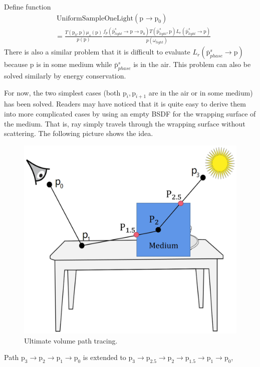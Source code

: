 \documentclass[acmtog]{acmart}
\def\w{\omega}
\def\p{\mathrm{p}}
\def\pp#1#2{\p_{#1}\rightarrow\p_{#2}}
\begin{document}
    Define function
\begin{equation} \label{eq16}
\begin{split}
    &\ \mathrm{UniformSampleOneLight}(\pp{}{0})\\
    &= \frac{T(\p_0,\p)\mu_s(\p)}{p({\p})} \frac{f_p(\bar{\p}^s_{light}\rightarrow\p\rightarrow\p_0)T(\bar{\p}^s_{light},\p)L_e(\bar{\p}^s_{light}\rightarrow\p)}{p(\w_{light})}
\end{split}
\end{equation}
    There is also a similar problem that it is difficult to evaluate $L_r(\bar{\p}^s_{phase}\rightarrow\p)$ because $\p$ is in some medium while $\bar{\p}^s_{phase}$ is in the air.
    This problem can also be solved similarly by energy conservation.\par
        For now, the two simplest cases (both $\p_i,\p_{i+1}$ are in the air or in some medium) has been solved.
    Readers may have noticed that it is quite easy to derive them into more complicated cases by using an empty BSDF for the wrapping surface of the medium.
    That is, ray simply travels through the wrapping surface without scattering.
    The following picture shows the idea.
\begin{figure}[H]
    \includegraphics[scale=0.045]{pictures/volume path tracing ultimate.jpg}
    \centering
    \caption{Ultimate volume path tracing.}
\end{figure}
    Path $\p_3\rightarrow\p_2\rightarrow\p_1\rightarrow\p_0$ is extended to $\p_3\rightarrow\p_{2.5}\rightarrow\p_2\rightarrow\p_{1.5}\rightarrow\p_1\rightarrow\p_0$, 
\end{document}
